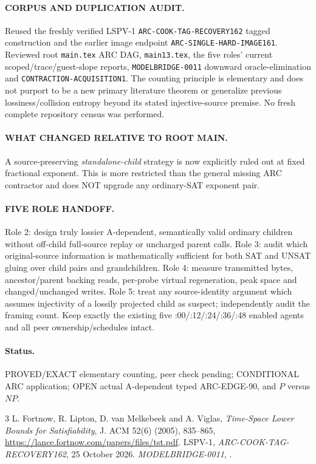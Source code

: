 \documentclass[11pt]{article}
\begin{document}
\paragraph{CORPUS AND DUPLICATION AUDIT.}
Reused the freshly verified LSPV-1
\texttt{ARC-COOK-TAG-RECOVERY162} tagged construction
and the earlier image endpoint
\texttt{ARC-SINGLE-HARD-IMAGE161}. Reviewed root
\texttt{main.tex} ARC DAG, \texttt{main13.tex},
the five roles' current scoped/trace/guest-slope
reports, \texttt{MODELBRIDGE-0011} downward
oracle-elimination and \texttt{CONTRACTION-ACQUISITION1}.
The counting principle is elementary and does not
purport to be a new primary literature theorem or
generalize previous lossiness/collision entropy
beyond its stated injective-source premise.
No fresh complete repository census was performed.

\paragraph{WHAT CHANGED RELATIVE TO ROOT MAIN.}
A source-preserving \emph{standalone-child}
strategy is now explicitly ruled out at fixed
fractional exponent. This is more restricted
than the general missing ARC contractor and
does NOT upgrade any ordinary-SAT exponent pair.

\paragraph{FIVE ROLE HANDOFF.}
Role 2: design truly lossier A-dependent, semantically valid
ordinary children without off-child full-source replay or
uncharged parent calls.
Role 3: audit which original-source information is
mathematically sufficient for both SAT and UNSAT
gluing over child pairs and grandchildren.
Role 4: measure transmitted bytes, ancestor/parent
backing reads, per-probe virtual regeneration,
peak space and changed/unchanged writes.
Role 5: treat any source-identity argument which
assumes injectivity of a lossily projected child
as suspect; independently audit the framing count.
Keep exactly the existing five :00/:12/:24/:36/:48
enabled agents and all peer ownership/schedules intact.

\paragraph{Status.}
PROVED/EXACT elementary counting, peer check pending;
CONDITIONAL ARC application; OPEN actual
A-dependent typed ARC-EDGE-90, and $P$ versus $NP$.
\begin{thebibliography}{3}
 L. Fortnow, R. Lipton,
D. van Melkebeek and A. Viglas,
\emph{Time-Space Lower Bounds for Satisfiability},
J. ACM 52(6) (2005), 835--865,
\url{https://lance.fortnow.com/papers/files/tst.pdf}.
 LSPV-1,
\emph{ARC-COOK-TAG-RECOVERY162}, 25 October 2026.
 \emph{MODELBRIDGE-0011},
.
\end{thebibliography}
\end{document}
